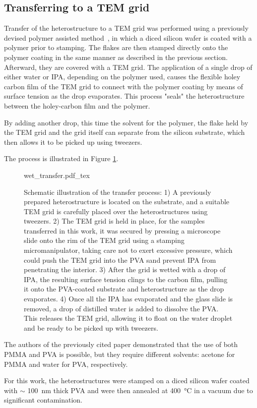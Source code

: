 \subsection{Transferring to a TEM grid}

Transfer of the heterostructure to a TEM grid was performed using a previously devised polymer assisted method~\cite{kosterPolymerassistedTEMSpecimen2021}, in which a diced silicon wafer is coated with a polymer prior to stamping.
%
The flakes are then stamped directly onto the polymer coating in the same manner as described in the previous section. Afterward, they are covered with a TEM grid. The application of a single drop of either water or IPA,  depending on the polymer used, causes the flexible holey carbon film of the TEM grid to connect with the polymer coating by means of surface tension as the drop evaporates. This process "seals" the heterostructure between the holey-carbon film and the polymer.

By adding another drop, this time the solvent for the polymer, the flake held by the TEM grid and the grid itself can separate from the silicon substrate, which then allows it to be picked up using tweezers.

The process is illustrated in Figure \ref{fig:wet_transfer}.

\begin{figure}[h]
	\centering
	\def\svgwidth{1\linewidth}
	{wet_transfer.pdf_tex}
	\caption{Schematic illustration of the transfer process: 1) A previously prepared heterostructure is located on the substrate, and a suitable TEM grid is carefully placed over the heterostructures using tweezers. 2) The TEM grid is held in place, for the samples transferred in this work, it was secured by pressing a microscope slide onto the rim of the TEM grid using a stamping micromanipulator, taking care not to exert excessive pressure, which could push the TEM grid into the PVA sand prevent IPA from penetrating the interior. 3) After the grid is wetted with a drop of IPA, the resulting surface tension clings to the carbon film, pulling it onto the PVA-coated substrate and heterostructure as the drop evaporates. 4) Once all the IPA has evaporated and the glass slide is removed, a drop of distilled water is added to dissolve the PVA. This releases the TEM grid, allowing it to float on the water droplet and be ready to be picked up with tweezers.}
	\label{fig:wet_transfer}
\end{figure}

The authors of the previously cited paper demonstrated that the use of both PMMA and PVA is possible, but they require different solvents: acetone for PMMA and water for PVA, respectively.

For this work, the heterostructures were stamped on a diced silicon wafer coated with \(\sim \) \SI{100}{\nm} thick PVA and were then annealed at \SI{400}{\degreeCelsius} in a vacuum due to significant contamination.
